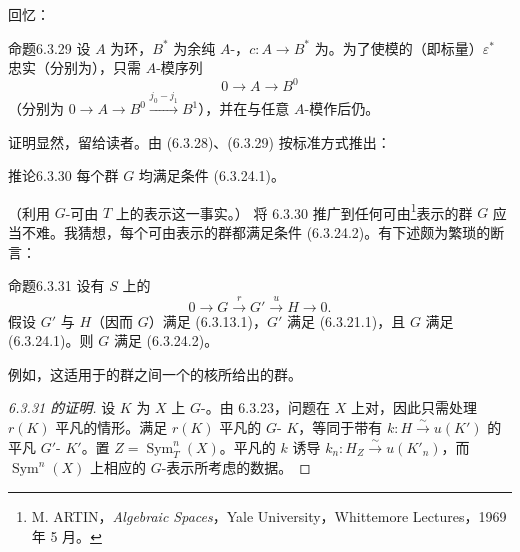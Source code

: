 回忆：
\begin{SGAresult}{命题}{6.3.29}
设 $A$ 为环，$B^*$ 为余纯 $A$-，$c:A\to B^*$ 为。为了使模的（即标量）$\varepsilon^*$ 忠实（分别为），只需 $A$-模序列
\[0\longrightarrow A\longrightarrow B^0\]
（分别为 $0\to A\to B^0\xrightarrow{j_0-j_1}B^1$），并在与任意 $A$-模作后仍。
\end{SGAresult}
证明显然，留给读者。由 (6.3.28)、(6.3.29) 按标准方式推出：
\begin{SGAresult}{推论}{6.3.30}
每个群 $G$ 均满足条件 (6.3.24.1)。
\end{SGAresult}
（利用 $G$-可由 $T$ 上的表示这一事实。）
将 6.3.30 推广到任何可由\footnote{M. ARTIN，\emph{Algebraic Spaces}，Yale University，Whittemore Lectures，1969 年 5 月。}表示的群 $G$ 应当不难。我猜想，每个可由表示的群都满足条件 (6.3.24.2)。有下述颇为繁琐的断言：
\begin{SGAresult}{命题}{6.3.31}
设有 $S$ 上的
\[0\longrightarrow G\xrightarrow{r}G'\xrightarrow{u}H\longrightarrow0.\]
假设 $G'$ 与 $H$（因而 $G$）满足 (6.3.13.1)，$G'$ 满足 (6.3.21.1)，且 $G$ 满足 (6.3.24.1)。则 $G$ 满足 (6.3.24.2)。
\end{SGAresult}
例如，这适用于的群之间一个的核所给出的群。
\begin{proof}[6.3.31 的证明]
设 $K$ 为 $X$ 上 $G$-。由 6.3.23，问题在 $X$ 上对，因此只需处理 $r(K)$ 平凡的情形。满足 $r(K)$ 平凡的 $G$- $K$，等同于带有 $k:H\xrightarrow{\sim}u(K')$ 的平凡 $G'$- $K'$。置 $Z=\operatorname{Sym}_T^n(X)$。平凡的 $k$ 诱导 $k_n:H_Z\xrightarrow{\sim}u(K'_n)$，而 $\operatorname{Sym}^n(X)$ 上相应的 $G$-表示所考虑的数据。
\end{proof}
